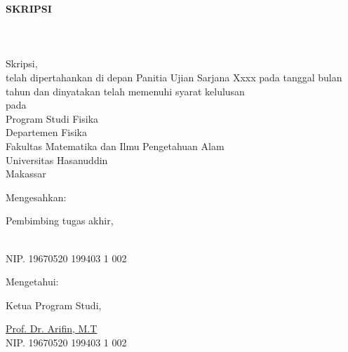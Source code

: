 
\begingroup
\singlespacing
\fontsize{11pt}{13pt}\selectfont
\begin{center}
  \textbf{SKRIPSI} \\
  \vfill
  \textbf{\JudulSkripsi} \\
  \vfill
  \textbf{\underline{\MakeTextUppercase{\NamaPenulis}}} \\
  \textbf{\NIM} \\
  \vfill
  \begingroup
  \fontsize{10pt}{13pt}\selectfont
  Skripsi, \\
  \vfill
  telah dipertahankan di depan Panitia Ujian Sarjana Xxxx pada
  tanggal bulan tahun dan dinyatakan telah memenuhi syarat kelulusan \\
  pada \\
  \vfill
  Program Studi Fisika \\
  Departemen Fisika \\
  Fakultas Matematika dan Ilmu Pengetahuan Alam \\
  Universitas Hasanuddin \\
  Makassar \\
  \vfill
  \noindent
  \begin{minipage}[t]{0.38\textwidth}
    Mengesahkan:\par
    Pembimbing tugas akhir,\par\vspace{2cm}

    \underline{\NamaPembimbing}\\
    NIP. 19670520 199403 1 002
  \end{minipage}
  \hfill
  \begin{minipage}[t]{0.38\textwidth}
    Mengetahui:\par
    Ketua Program Studi,\par\vspace{2cm}

    \underline{Prof. Dr. Arifin, M.T}\\
    NIP. 19670520 199403 1 002
  \end{minipage}
  \endgroup
\end{center}

\endgroup
\restoregeometry
\clearpage
{}
